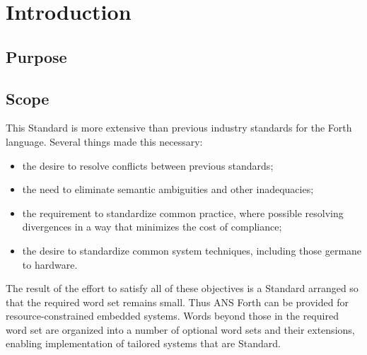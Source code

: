 \label{annex:rationale}

\ifanswerfiles
\fi

\newcommand{\readrationale}[1]{%
	\ifinline
		\fbox{\parbox{\linewidth}{\slshape
		In the \emph{review} (r) version of the document the
		rationale text for each of the words is given in with
		the main definition of the word.  The rationale for
		words in the \textbf{#1} wordset will appear here in
		the final document.
		}}
	\else
		\defersection{}
		
		\stepsection
	\fi
}

\section{Introduction} %

\subsection{Purpose} %

\subsection{Scope} %

This Standard is more extensive than previous industry standards
for the Forth language. Several things made this necessary:

\begin{itemize}
\item the desire to resolve conflicts between previous standards;
\item the need to eliminate semantic ambiguities and other
	inadequacies;
\item the requirement to standardize common practice, where possible
	resolving divergences in a way that minimizes the cost of
	compliance;
\item the desire to standardize common system techniques, including
	those germane to hardware.
\end{itemize}

The result of the effort to satisfy all of these objectives is a
Standard arranged so that the required word set remains small. Thus
ANS Forth can be provided for resource-constrained embedded systems.
Words beyond those in the required word set are organized into a
number of optional word sets and their extensions, enabling
implementation of tailored systems that are Standard.

